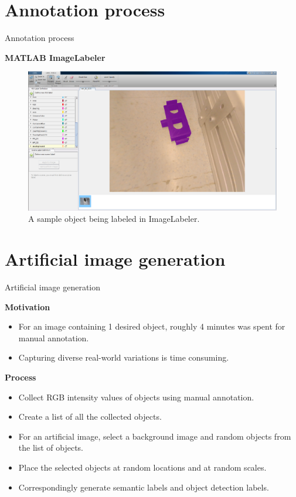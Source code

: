 \documentclass{beamer}
\begin{document}
\section{Annotation process}

\begin{frame}{Annotation process}
	
	\textbf{MATLAB ImageLabeler}
	\begin{figure}[!htb]
		\centering
		\includegraphics[width=.8\linewidth]{images/imglabler_eg}
		\caption{A sample object being labeled in ImageLabeler.}
		\label{Fig:annotate}
	\end{figure}

\end{frame}

\section{Artificial image generation}

\begin{frame}{Artificial image generation}

	\textbf{Motivation}
		\begin{itemize}
			\item For an image containing 1 desired object, roughly 4 minutes was spent for manual annotation.
			\item Capturing diverse real-world variations is time consuming.
		\end{itemize}
		
	\vspace{5mm}
		
	\textbf{Process}
		\begin{itemize}
			\item Collect RGB intensity values of objects using manual annotation.
			\item Create a list of all the collected objects.
			\item For an artificial image, select a background image and random objects from the list of objects. 
			\item Place the selected objects at random locations and at random scales. 
			\item Correspondingly generate semantic labels and object detection labels.
		\end{itemize}

\end{frame}
\end{document}
